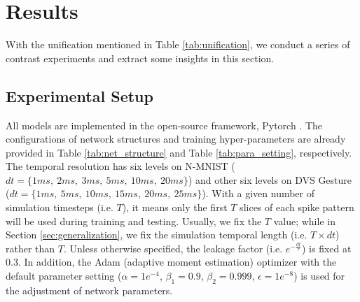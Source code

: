 \documentclass[journal,10pt,twocolumn]{IEEETran}
\begin{document}
\begin{table}[!htbp]
\caption{Unification for comparison.}
\label{tab:unification}
\vspace{2pt}
\centering
\renewcommand\arraystretch{1.4}
\end{table}
 \section{Results}\label{sec:result}

With the unification mentioned in Table \ref{tab:unification}, we conduct a series of contrast experiments and extract some insights in this section.

\subsection{Experimental Setup}
All models are implemented in the open-source framework, Pytorch \cite{paszke2019pytorch}. The configurations of network structures and training hyper-parameters are already provided in Table \ref{tab:net_structure} and Table \ref{tab:para_setting}, respectively. The temporal resolution has six levels on N-MNIST ($dt=\{1ms,~2ms,~3ms,~5ms,~10ms,~20ms\}$) and other six levels on DVS Gesture ($dt=\{1ms,~5ms,~10ms,~15ms,~20ms,~25ms\}$). With a given number of simulation timesteps (i.e. $T$), it means only the first $T$ slices of each spike pattern will be used during training and testing. Usually, we fix the $T$ value; while in Section \ref{sec:generalization}, we fix the simulation temporal length (i.e. $T\times dt$) rather than $T$. Unless otherwise specified, the leakage factor (i.e. $e^{-\frac{dt}{\tau}}$) is fixed at 0.3. In addition, the Adam (adaptive moment estimation) optimizer \cite{kingma2014adam} with the default parameter setting ($\alpha=1e^{-4}$, $\beta_{1}=0.9$, $\beta_{2}=0.999$, $\epsilon=1e^{-8}$) is used for the adjustment of network parameters. 
\end{document}
